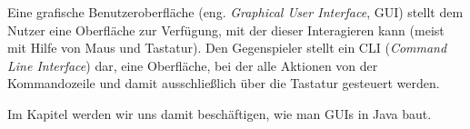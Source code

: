 
Eine grafische Benutzeroberfläche (eng. \textit{Graphical User Interface}, GUI) stellt dem Nutzer eine Oberfläche zur Verfügung, mit der dieser Interagieren kann (meist mit Hilfe von Maus und Tastatur). Den Gegenspieler stellt ein CLI (\textit{Command Line Interface}) dar, eine Oberfläche, bei der alle Aktionen von der Kommandozeile und damit ausschließlich über die Tastatur gesteuert werden.

Im Kapitel  werden wir uns damit beschäftigen, wie man GUIs in Java baut.